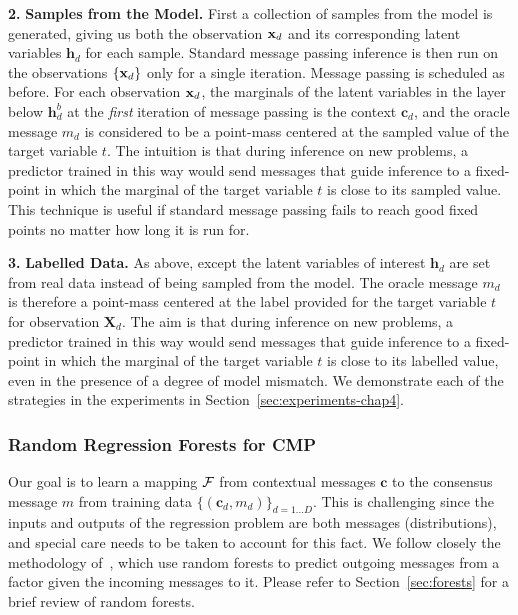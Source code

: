 \textbf{2.\,\,Samples from the Model.} First a collection of samples from the model is generated, giving us both the observation $\mathbf{x}_d$ and its corresponding latent variables $\mathbf{h}_d$ for each sample. Standard message passing inference is then run on the observations $\{ \mathbf{x}_d \}$ only for a single iteration. Message passing is scheduled as before. For each observation $\mathbf{x}_d$, the marginals of the latent variables in the layer below $\mathbf{h}^b_d$ at the \textit{first} iteration of message passing is the context $\mathbf{c}_d$, and the oracle message $m_d$ is considered to be a point-mass centered at the sampled value of the target variable $t$. The intuition is that during inference on new problems, a predictor trained in this way would send messages that guide inference to a fixed-point in which the marginal of the target variable $t$ is close to its sampled value. This technique is useful if standard message passing fails to reach good fixed points no matter how long it is run for.

\textbf{3.\,\,Labelled Data.} As above, except the latent variables of interest $\mathbf{h}_d$ are set from real data instead of being sampled from the model. The oracle message $m_d$ is therefore a point-mass centered at the label provided for the target variable $t$ for observation $\mathbf{X}_d$. The aim is that during inference on new problems, a predictor trained in this way would send messages that guide inference to a fixed-point in which the marginal of the target variable $t$ is close to its labelled value, even in the presence of a degree of model mismatch. We demonstrate each of the strategies in the experiments in Section~\ref{sec:experiments-chap4}.

\subsubsection{Random Regression Forests for CMP}

Our goal is to learn a mapping $\mathcal{F}$ from contextual messages $\mathbf{c}$ to the consensus message $m$ from training data $\{ (\mathbf{c}_d, m_d) \}_{d=1...D}$. This is challenging since the inputs and outputs of the regression problem are both messages (\ie distributions), and special care needs to be taken to account for this fact. We follow closely the methodology of~\cite{Eslami2014}, which use random forests to predict outgoing messages from a factor given the incoming messages to it. Please refer to Section~\ref{sec:forests} for a brief review of random forests.

